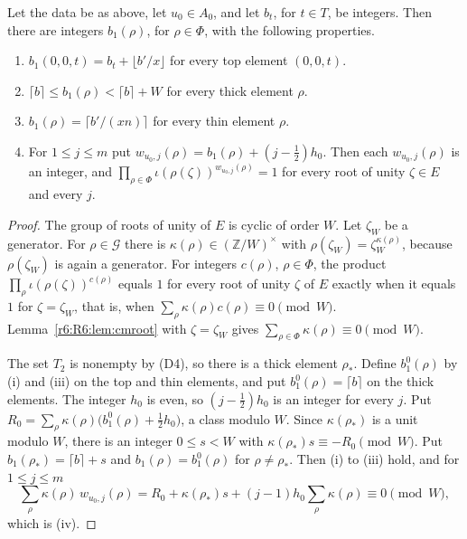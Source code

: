 \begin{proposition}\label{r6:R6:prop:nodes}
Let the data be as above, let $u_0\in A_0$, and let $b_t$, for $t\in T$, be integers. Then there are integers $b_1(\rho)$, for $\rho\in\Phi$, with the following properties.
\begin{enumerate}
\item[(i)] $b_1(0,0,t)=b_t+\lfloor b'/x\rfloor$ for every top element $(0,0,t)$.
\item[(ii)] $\lceil b\rceil\le b_1(\rho)<\lceil b\rceil+W$ for every thick element $\rho$.
\item[(iii)] $b_1(\rho)=\lceil b'/(xn)\rceil$ for every thin element $\rho$.
\item[(iv)] For $1\le j\le m$ put $w_{u_0,j}(\rho)=b_1(\rho)+(j-\frac12)h_0$. Then each $w_{u_0,j}(\rho)$ is an integer, and $\prod_{\rho\in\Phi}\iota(\rho(\zeta))^{w_{u_0,j}(\rho)}=1$ for every root of unity $\zeta\in E$ and every $j$.
\end{enumerate}
\end{proposition}

\begin{proof}
The group of roots of unity of $E$ is cyclic of order $W$. Let $\zeta_W$ be a generator. For $\rho\in\mathcal G$ there is $\kappa(\rho)\in(\mathbb Z/W)^\times$ with $\rho(\zeta_W)=\zeta_W^{\kappa(\rho)}$, because $\rho(\zeta_W)$ is again a generator. For integers $c(\rho)$, $\rho\in\Phi$, the product $\prod_\rho\iota(\rho(\zeta))^{c(\rho)}$ equals $1$ for every root of unity $\zeta$ of $E$ exactly when it equals $1$ for $\zeta=\zeta_W$, that is, when $\sum_\rho\kappa(\rho)c(\rho)\equiv0\pmod W$. Lemma~\ref{r6:R6:lem:cmroot} with $\zeta=\zeta_W$ gives $\sum_{\rho\in\Phi}\kappa(\rho)\equiv0\pmod W$.

The set $T_2$ is nonempty by (D4), so there is a thick element $\rho_\ast$. Define $b_1^0(\rho)$ by (i) and (iii) on the top and thin elements, and put $b_1^0(\rho)=\lceil b\rceil$ on the thick elements. The integer $h_0$ is even, so $(j-\frac12)h_0$ is an integer for every $j$. Put $R_0=\sum_\rho\kappa(\rho)\big(b_1^0(\rho)+\frac12h_0\big)$, a class modulo $W$. Since $\kappa(\rho_\ast)$ is a unit modulo $W$, there is an integer $0\le s<W$ with $\kappa(\rho_\ast)s\equiv-R_0\pmod W$. Put $b_1(\rho_\ast)=\lceil b\rceil+s$ and $b_1(\rho)=b_1^0(\rho)$ for $\rho\ne\rho_\ast$. Then (i) to (iii) hold, and for $1\le j\le m$
\[
\sum_\rho\kappa(\rho)\,w_{u_0,j}(\rho)=R_0+\kappa(\rho_\ast)s+(j-1)h_0\sum_\rho\kappa(\rho)\equiv0\pmod W,
\]
which is (iv).
\end{proof}


